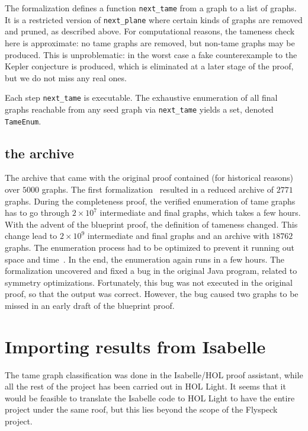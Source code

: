 The formalization defines a function \verb!next_tame! from a graph to
a list of graphs. It is a restricted version of \verb!next_plane!
where certain kinds of graphs are removed and pruned, as described
above.  For computational reasons, the tameness check here is
approximate: no tame graphs are removed, but non-tame graphs may be
produced. This is unproblematic: in the worst case a fake
counterexample to the Kepler conjecture is produced, which is
eliminated at a later stage of the proof, but we do not miss any real
ones.

Each step \verb!next_tame! is executable. The exhaustive enumeration
of all final graphs reachable from any seed graph via \verb!next_tame!
yields a set, denoted \verb!TameEnum!.

\subsection{the archive}
\label{Archive}

The archive that came with the original proof contained (for historical
reasons) over $5000$ graphs. The first
formalization~\cite{NipkowBS-IJCAR06} resulted in a reduced archive of
$2771$ graphs. During the completeness proof, the verified enumeration
of tame graphs has to go through $2\times 10^7$ intermediate and final
graphs, which takes a few hours. With the advent of the blueprint
proof, the definition of tameness changed. This change lead to $2
\times 10^9$ intermediate and final graphs and an archive with $18762$
graphs. The enumeration process had to be optimized to prevent it
running out space and time~\cite{Nipkow-ITP11}. In the end, the
enumeration again runs in a few hours.  The formalization uncovered
and fixed a bug in the original Java program, related to symmetry
optimizations.  Fortunately, this bug was not executed in the original
proof, so that the output was correct.  However, the bug caused two
graphs to be missed in an early draft of the blueprint proof.


\section{Importing results from Isabelle}


The tame graph classification was done in the Isabelle/HOL proof
assistant, while all the rest of the project has been carried out in
HOL Light.  It seems that it would be feasible to translate the
Isabelle code to HOL Light to have the entire project under the same
roof, but this lies beyond the scope of the Flyspeck project.

